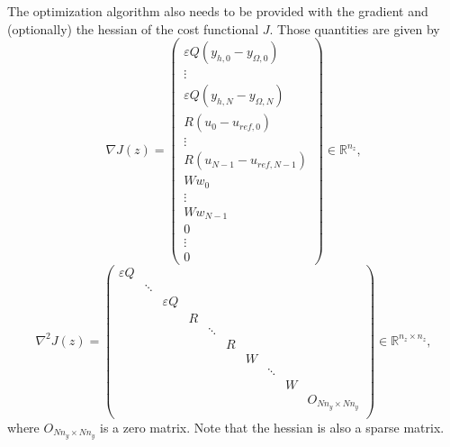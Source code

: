 \documentclass[
12pt, %
a4paper, %
onecolumn, %
portrait %
]{article}
\begin{document}
The optimization algorithm also needs to be provided with the gradient and (optionally) the hessian of the cost functional $J$. Those quantities are given by
\begin{equation}
\nabla J(z) = 
\begin{pmatrix}
\varepsilon Q (y_{h,0} - y_{\Omega,0}) \\
\vdots \\
\varepsilon Q (y_{h,N} - y_{\Omega,N}) \\
R (u_0 - u_{ref,0}) \\
\vdots \\
R (u_{N-1} - u_{ref,N-1}) \\
W w_0 \\
\vdots \\
W w_{N-1} \\
0 \\
\vdots \\
0
\end{pmatrix} \in \mathbb{R}^{n_z},
\end{equation}
\def\eQ{\varepsilon Q}
\begin{equation}
\nabla^2 J(z) = 
\begin{pmatrix}
\eQ &        &     &   &        &   &   &        &   &                  \\
    & \ddots &     &   &        &   &   &        &   &                  \\
    &        & \eQ &   &        &   &   &        &   &                  \\
    &        &     & R &        &   &   &        &   &                  \\
    &        &     &   & \ddots &   &   &        &   &                  \\
    &        &     &   &        & R &   &        &   &                  \\
    &        &     &   &        &   & W &        &   &                  \\
    &        &     &   &        &   &   & \ddots &   &                  \\
    &        &     &   &        &   &   &        & W &                  \\
    &        &     &   &        &   &   &        &   & O_{N n_y\times N n_y}\\
\end{pmatrix} \in \mathbb{R}^{n_z \times n_z},
\end{equation}
where $O_{N n_y\times N n_y}$ is a zero matrix. Note that the hessian is also a sparse matrix.
\end{document}
